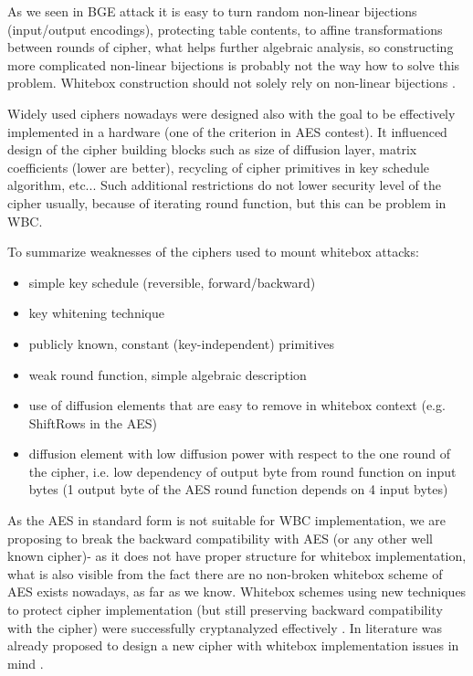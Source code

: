 \documentclass[11pt,oneside,final]{fithesis2}
\begin{document}
    As we seen in BGE attack it is easy to turn random non-linear bijections (input/output encodings), protecting table contents, to affine transformations between rounds of
    cipher, what helps further algebraic analysis, so constructing more complicated non-linear bijections is probably not the way how to solve this problem. Whitebox construction
    should not solely rely on non-linear bijections \citep{Billet:2004:CWB:2080787.2080809, Michiels:2007:MST:1314276.1314291}.
    
    Widely used ciphers nowadays were designed also with the goal to be effectively implemented in a hardware (one of the criterion in AES contest). 
    It influenced design of the cipher building blocks such as
    size of diffusion layer, matrix coefficients (lower are better), recycling of cipher primitives in key schedule algorithm, etc...
    Such additional restrictions do not lower security level of the cipher usually, because of iterating round function, but this can be problem in WBC.
    
    To summarize weaknesses of the ciphers used to mount whitebox attacks:
    \begin{itemize}
     \item simple key schedule (reversible, forward/backward)
     \item key whitening technique
     \item publicly known, constant (key-independent) primitives
     \item weak round function, simple algebraic description
     \item use of diffusion elements that are easy to remove in whitebox context (e.g. ShiftRows in the AES)
     \item diffusion element with low diffusion power with respect to the one round of the cipher, i.e. low dependency of 
	    output byte from round function on input bytes (1 output byte of the AES round function depends on 4 input bytes)
    \end{itemize}
    
    As the AES in standard form is not suitable for WBC implementation, we are proposing to break the backward compatibility with AES (or any other well known cipher)- as it does not have proper structure for whitebox implementation, what is 
    also visible from the fact there are no non-broken whitebox scheme of AES exists nowadays, as far as we know. Whitebox schemes using new techniques to protect cipher implementation
    (but still preserving backward compatibility with the cipher) were successfully cryptanalyzed effectively \citep{Billet:2004:CWB:2080787.2080809, Michiels:2007:MST:1314276.1314291, conf/indocrypt/MulderWP10, conf/sacrypt/MulderRP12}.    
    In literature was already proposed to design a new cipher with whitebox implementation issues in mind \citep{Billet:2004:CWB:2080787.2080809}. 
    
\end{document}
